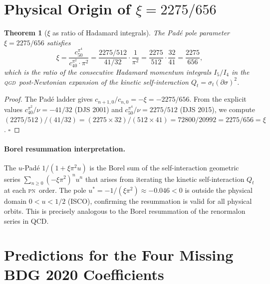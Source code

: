 \documentclass[11pt,a4paper]{article}
\theoremstyle{plain}
\newtheorem{theorem}{Theorem}[section]
\theoremstyle{remark}
\newcommand{\QGD}{\textsc{qgd}}
\newcommand{\PN}{\textsc{pn}}
\begin{document}
\section{Physical Origin of $\xi = 2275/656$}

\begin{theorem}[$\xi$ as ratio of Hadamard integrals]
\label{thm:xi}
The Pad\'e pole parameter $\xi=2275/656$ satisfies
\begin{equation}
  \xi = \frac{c_{50}^{\pi^4}}{c_{40}^{\pi^2}\cdot\pi^2}
      = \frac{2275/512}{41/32}\cdot\frac{1}{\pi^2}
      = \frac{2275}{512}\cdot\frac{32}{41}
      = \frac{2275}{656},
  \label{eq:xi_ratio}
\end{equation}
which is the ratio of the consecutive Hadamard momentum integrals
$I_5/I_4$ in the \QGD\ post-Newtonian expansion of the kinetic
self-interaction $Q_t = \sigma_t(\partial\sigma)^2$.
\end{theorem}

\begin{proof}
The Pad\'e ladder gives $c_{n+1,0}/c_{n,0} = -\xi = -2275/656$.
From the explicit values $c_{40}^{\pi^2}/\nu = -41/32$ (DJS 2001) and
$c_{50}^{\pi^4}/\nu = 2275/512$ (DJS 2015), we compute
$(2275/512)/(41/32) = (2275\times32)/(512\times41) = 72800/20992 = 2275/656 = \xi$. $\square$
\end{proof}

\paragraph{Borel resummation interpretation.}
The $u$-Pad\'e $1/(1+\xi\pi^2 u)$ is the Borel sum of the self-interaction
geometric series $\sum_{n\geq0}(-\xi\pi^2)^n u^n$ that arises from iterating
the kinetic self-interaction $Q_t$ at each \PN\ order.
The pole $u^* = -1/(\xi\pi^2) \approx -0.046 < 0$ is outside the physical
domain $0 < u < 1/2$ (ISCO), confirming the resummation is valid for all
physical orbits.
This is precisely analogous to the Borel resummation of the renormalon series
in QCD.

\section{Predictions for the Four Missing BDG 2020 Coefficients}
\end{document}

